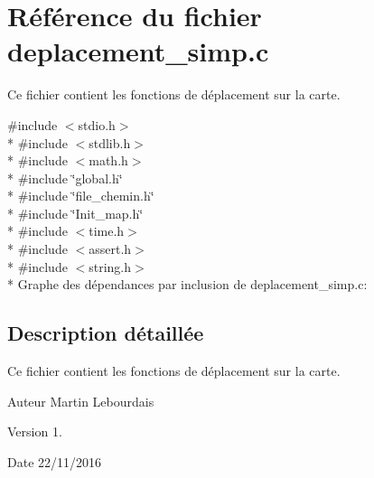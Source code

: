 \hypertarget{a00013}{}\section{Référence du fichier deplacement\+\_\+simp.\+c}
\label{a00013}


Ce fichier contient les fonctions de déplacement sur la carte.  


{\ttfamily \#include $<$stdio.\+h$>$}\\*
{\ttfamily \#include $<$stdlib.\+h$>$}\\*
{\ttfamily \#include $<$math.\+h$>$}\\*
{\ttfamily \#include \char`\"{}global.\+h\char`\"{}}\\*
{\ttfamily \#include \char`\"{}file\+\_\+chemin.\+h\char`\"{}}\\*
{\ttfamily \#include \char`\"{}Init\+\_\+map.\+h\char`\"{}}\\*
{\ttfamily \#include $<$time.\+h$>$}\\*
{\ttfamily \#include $<$assert.\+h$>$}\\*
{\ttfamily \#include $<$string.\+h$>$}\\*
Graphe des dépendances par inclusion de deplacement\+\_\+simp.\+c\+:


\subsection{Description détaillée}
Ce fichier contient les fonctions de déplacement sur la carte. 

\begin{DoxyAuthor}{Auteur}
Martin Lebourdais 
\end{DoxyAuthor}
\begin{DoxyVersion}{Version}
1. 
\end{DoxyVersion}
\begin{DoxyDate}{Date}
22/11/2016 
\end{DoxyDate}
